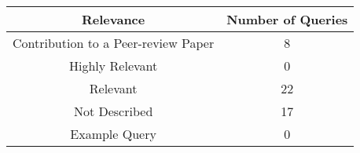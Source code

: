 \begin{center}
    \begin{tabular}{|c|c|}
        Relevance & Number of Queries \\
        \hline
        Contribution to a Peer-review Paper & 8 \\
        \hline
        Highly Relevant                     & 0 \\
        \hline
        Relevant                            & 22 \\
        \hline
        Not Described                       & 17 \\
        \hline
        Example Query                       & 0 \\
    \end{tabular}
\end{center}
    